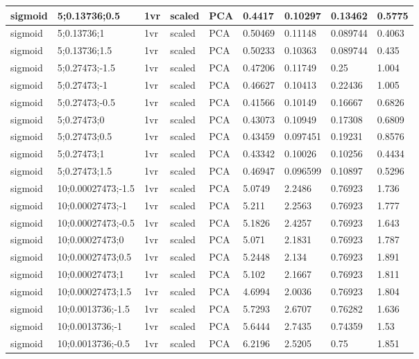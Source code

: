 \begin{longtable}{lllllllll}
sigmoid & 5;0.13736;0.5 & 1vr & scaled & PCA & 0.4417 & 0.10297 & 0.13462 & 0.5775\\ \hline
sigmoid & 5;0.13736;1 & 1vr & scaled & PCA & 0.50469 & 0.11148 & 0.089744 & 0.4063\\ \hline
sigmoid & 5;0.13736;1.5 & 1vr & scaled & PCA & 0.50233 & 0.10363 & 0.089744 & 0.435\\ \hline
sigmoid & 5;0.27473;-1.5 & 1vr & scaled & PCA & 0.47206 & 0.11749 & 0.25 & 1.004\\ \hline
sigmoid & 5;0.27473;-1 & 1vr & scaled & PCA & 0.46627 & 0.10413 & 0.22436 & 1.005\\ \hline
sigmoid & 5;0.27473;-0.5 & 1vr & scaled & PCA & 0.41566 & 0.10149 & 0.16667 & 0.6826\\ \hline
sigmoid & 5;0.27473;0 & 1vr & scaled & PCA & 0.43073 & 0.10949 & 0.17308 & 0.6809\\ \hline
sigmoid & 5;0.27473;0.5 & 1vr & scaled & PCA & 0.43459 & 0.097451 & 0.19231 & 0.8576\\ \hline
sigmoid & 5;0.27473;1 & 1vr & scaled & PCA & 0.43342 & 0.10026 & 0.10256 & 0.4434\\ \hline
sigmoid & 5;0.27473;1.5 & 1vr & scaled & PCA & 0.46947 & 0.096599 & 0.10897 & 0.5296\\ \hline
sigmoid & 10;0.00027473;-1.5 & 1vr & scaled & PCA & 5.0749 & 2.2486 & 0.76923 & 1.736\\ \hline
sigmoid & 10;0.00027473;-1 & 1vr & scaled & PCA & 5.211 & 2.2563 & 0.76923 & 1.777\\ \hline
sigmoid & 10;0.00027473;-0.5 & 1vr & scaled & PCA & 5.1826 & 2.4257 & 0.76923 & 1.643\\ \hline
sigmoid & 10;0.00027473;0 & 1vr & scaled & PCA & 5.071 & 2.1831 & 0.76923 & 1.787\\ \hline
sigmoid & 10;0.00027473;0.5 & 1vr & scaled & PCA & 5.2448 & 2.134 & 0.76923 & 1.891\\ \hline
sigmoid & 10;0.00027473;1 & 1vr & scaled & PCA & 5.102 & 2.1667 & 0.76923 & 1.811\\ \hline
sigmoid & 10;0.00027473;1.5 & 1vr & scaled & PCA & 4.6994 & 2.0036 & 0.76923 & 1.804\\ \hline
sigmoid & 10;0.0013736;-1.5 & 1vr & scaled & PCA & 5.7293 & 2.6707 & 0.76282 & 1.636\\ \hline
sigmoid & 10;0.0013736;-1 & 1vr & scaled & PCA & 5.6444 & 2.7435 & 0.74359 & 1.53\\ \hline
sigmoid & 10;0.0013736;-0.5 & 1vr & scaled & PCA & 6.2196 & 2.5205 & 0.75 & 1.851\\ \hline

\end{longtable}
